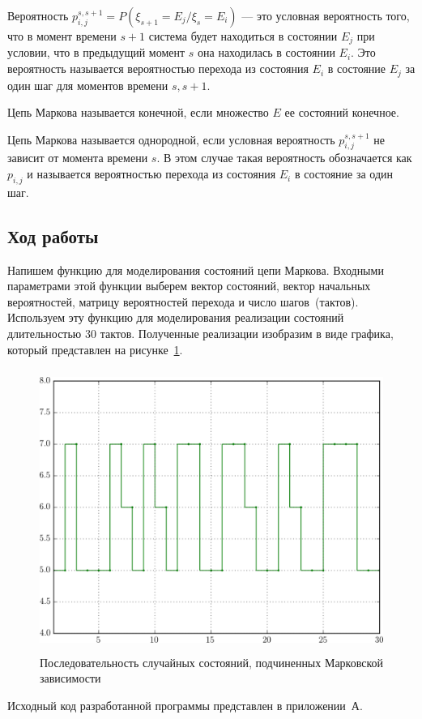 Вероятность $ p_{i,j}^{s,s+1} = P(\xi_{s+1} = E_j / \xi_s = E_i) $ --- это условная
вероятность того, что в момент времени $ s+1 $ система будет находиться
в состоянии $ E_j $ при условии, что в предыдущий момент $ s $ она находилась
в состоянии $ E_i $. Это вероятность называется вероятностью перехода
из состояния $ E_i $ в состояние $ E_j $ за один шаг для моментов времени $ s, s+1 $.

Цепь Маркова называется конечной, если множество $ E $ ее состояний конечное.

Цепь Маркова называется однородной, если условная вероятность $ p_{i,j}^{s,s+1} $
не зависит от момента времени $s$. В этом случае такая вероятность обозначается
как $ p_{i,j} $ и называется вероятностью перехода из состояния $ E_i $ в состояние  за один шаг.

\pagebreak

\subsection{Ход работы}

Напишем функцию для моделирования состояний цепи Маркова. Входными параметрами
этой функции выберем вектор состояний, вектор начальных вероятностей,
матрицу вероятностей перехода и число шагов~(тактов). Используем эту
функцию для моделирования реализации состояний длительностью 30 тактов.
Полученные реализации изобразим в виде графика, который представлен
на рисунке~\ref{pic:chain}.
\begin{figure}[h]
  \centering
  \includegraphics[width=150mm, height=92mm]{pic/chain}
  \caption{Последовательность случайных состояний,
    подчиненных Марковской зависимости}
  \label{pic:chain}
\end{figure}

Исходный код разработанной программы представлен в приложении~А.

\pagebreak